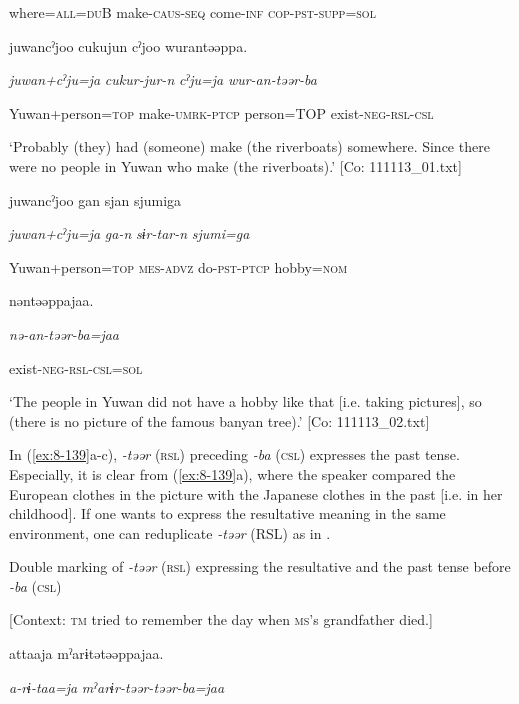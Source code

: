       where=\textsc{all}=\textsc{du}B  make-\textsc{caus}-\textsc{seq}  come-\textsc{inf}  \textsc{cop}-\textsc{pst}-\textsc{supp}=\textsc{sol}

      juwancˀjoo  cukujun  cˀjoo  wurantəəppa.

      \textit{juwan+cˀju=ja}  \textit{cukur-jur-n}  \textit{cˀju=ja}  \textit{wur-an-təər-ba}

      Yuwan+person=\textsc{top}  make-\textsc{umrk}-\textsc{ptcp}  person=TOP  exist-\textsc{neg}-\textsc{rsl}-\textsc{csl}

\glt ‘Probably (they) had (someone) make (the riverboats) somewhere. Since there were no people in Yuwan who make (the riverboats).’ [Co: 111113\_01.txt]

    {\TM}
\glll  juwancˀjoo  gan  sjan  {\textbar}sjumi{\textbar}ga

      \textit{juwan+cˀju=ja}  \textit{ga-n}  \textit{sɨr-tar-n}  \textit{sjumi=ga}

      Yuwan+person=\textsc{top}  \textsc{mes}-\textsc{advz}  do-\textsc{pst}-\textsc{ptcp}  hobby=\textsc{nom}

      nəntəəppajaa.

      \textit{nə-an-təər-ba=jaa}

      exist-\textsc{neg}-\textsc{rsl}-\textsc{csl}=\textsc{sol}

\glt ‘The people in Yuwan did not have a hobby like that [i.e. taking pictures], so (there is no picture of the famous banyan tree).’ [Co: 111113\_02.txt]
\z

In (\ref{ex:8-139}a-c), \textit{-təər} (\textsc{rsl}) preceding \textit{{}-ba} (\textsc{csl}) expresses the past tense. Especially, it is clear from (\ref{ex:8-139}a), where the speaker compared the European clothes in the picture with the Japanese clothes in the past [i.e. in her childhood]. If one wants to express the resultative meaning in the same environment, one can reduplicate \textit{-təər} (RSL) as in .

\ea\label{ex:8-140}
  Double marking of \textit{{}-təər} (\textsc{rsl}) expressing the resultative and the past tense before \textit{{}-ba} (\textsc{csl})

  [Context: \textsc{tm} tried to remember the day when \textsc{ms}’s grandfather died.]

  {\TM}
\glll  attaaja  mˀarɨtətəəppajaa.

    \textit{a-rɨ-taa=ja}  \textit{mˀarɨr-təər-təər-ba=jaa}

